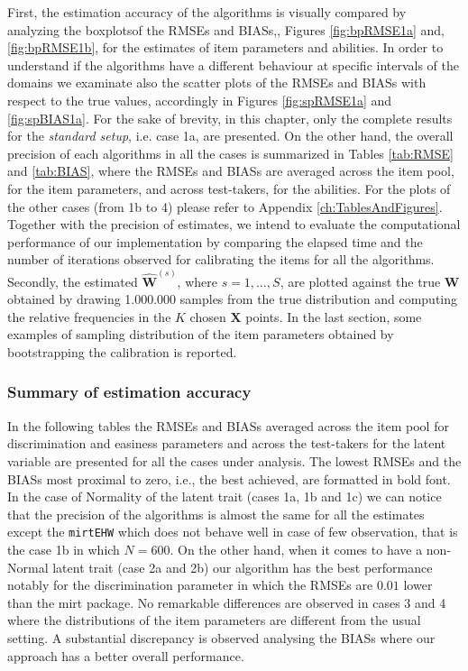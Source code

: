 First, the estimation accuracy of the algorithms is visually compared by analyzing the boxplotsof the RMSEs and BIASs,, Figures \ref{fig:bpRMSE1a} and, \ref{fig:bpRMSE1b}, for the estimates of item parameters and abilities. In order to understand if the algorithms have a different behaviour at specific intervals of the domains we examinate also the scatter plots of the RMSEs and BIASs with respect to the true values, accordingly in Figures \ref{fig:spRMSE1a} and \ref{fig:spBIAS1a}. For the sake of brevity, in this chapter, only the complete results for the \emph{standard setup}, i.e. case 1a, are presented. On the other hand, the overall precision of each algorithms in all the cases is summarized in Tables \ref{tab:RMSE} and \ref{tab:BIAS}, where the RMSEs and BIASs are averaged across the item pool, for the item parameters, and across test-takers, for the abilities. For the plots of the other cases (from 1b to 4) please refer to Appendix \ref{ch:TablesAndFigures}.
Together with the precision of estimates, we intend to evaluate the computational performance of our implementation by comparing the elapsed time and the number of iterations observed for calibrating the items for all the algorithms.
Secondly, the estimated $\mathbf{\hat{W}}^{(s)}$, where $s=1,\ldots,S$, are plotted against the true $\mathbf{W}$ obtained by drawing 1.000.000 samples from the true distribution and computing the relative frequencies in the $K$ chosen $\mathbf{X}$ points.
In the last section, some examples of sampling distribution of the item parameters obtained by bootstrapping the calibration is reported. 

\subsubsection{Summary of estimation accuracy}
In the following tables the RMSEs and BIASs averaged across the item pool for discrimination and easiness parameters and across the test-takers for the latent variable are presented for all the cases under analysis. The lowest RMSEs and the BIASs most proximal to zero, i.e., the best achieved, are formatted in bold font. 
In the case of Normality of the latent trait (cases 1a, 1b and 1c) we can notice that the precision of the algorithms is almost the same for all the estimates except the \texttt{mirt\tiny{EHW}} which does not behave well in case of few observation, that is the case 1b in which $N=600$.
On the other hand, when it comes to have a non-Normal latent trait (case 2a and 2b) our algorithm has the best performance notably for the discrimination parameter in which the RMSEs are $0.01$ lower than the mirt package. No remarkable differences are observed in cases 3 and 4 where the distributions of the item parameters are different from the usual setting.
A substantial discrepancy is observed analysing the BIASs where our approach has a better overall performance.

